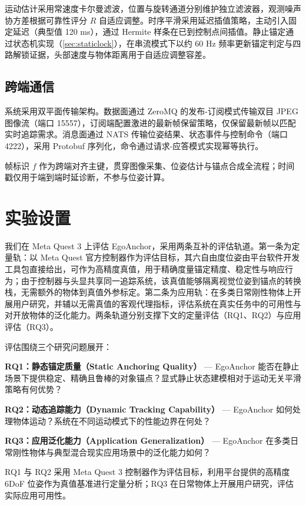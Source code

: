 \documentclass[review]{vgtc}
\begin{document}
运动估计采用常速度卡尔曼滤波，位置与旋转通道分别维护独立滤波器，观测噪声协方差根据可靠性评分 $R$ 自适应调整。时序平滑采用延迟插值策略，主动引入固定延迟（典型值 120 ms），通过 Hermite 样条在已到控制点间插值。静止锚定通过状态机实现（\ref{sec:staticlock}），在串流模式下以约 60 Hz 频率更新锚定判定与四路解锁证据，头部速度与物体距离用于自适应调整容差。

\subsection{跨端通信}


系统采用双平面传输架构。数据面通过 ZeroMQ 的发布-订阅模式传输双目 JPEG 图像流（端口 15557），订阅端配置激进的最新帧保留策略，仅保留最新帧以匹配实时追踪需求。消息面通过 NATS 传输位姿结果、状态事件与控制命令（端口 4222），采用 Protobuf 序列化，命令通过请求-应答模式实现幂等执行。

帧标识 $f$ 作为跨端对齐主键，贯穿图像采集、位姿估计与锚点合成全流程；时间戳仅用于端到端时延诊断，不参与位姿计算。

\section{实验设置}\label{sec:eval}


我们在 Meta Quest 3 上评估 EgoAnchor，采用两条互补的评估轨道。第一条为定量轨：以 Meta Quest 官方控制器作为评估目标，其六自由度位姿由平台软件开发工具包直接给出，可作为高精度真值，用于精确度量锚定精度、稳定性与响应行为；由于控制器与头显共享同一追踪系统，该真值能够隔离视觉位姿到锚点的转换栈，无需额外的物体到真值外参标定。第二条为应用轨：在多类日常刚性物体上开展用户研究，并辅以无需真值的客观代理指标，评估系统在真实任务中的可用性与对开放物体的泛化能力。两条轨道分别支撑下文的定量评估（RQ1、RQ2）与应用评估（RQ3）。

评估围绕三个研究问题展开：

\textbf{RQ1：静态锚定质量（Static Anchoring Quality）} --- EgoAnchor 能否在静止场景下提供稳定、精确且鲁棒的对象锚点？显式静止状态建模相对于运动无关平滑策略有何优势？

\textbf{RQ2：动态追踪能力（Dynamic Tracking Capability）} --- EgoAnchor 如何处理物体运动？系统在不同运动模式下的性能边界在何处？

\textbf{RQ3：应用泛化能力（Application Generalization）} --- EgoAnchor 在多类日常刚性物体与典型混合现实应用场景中的泛化能力如何？

RQ1 与 RQ2 采用 Meta Quest 3 控制器作为评估目标，利用平台提供的高精度 6DoF 位姿作为真值基准进行定量分析；RQ3 在日常物体上开展用户研究，评估实际应用可用性。
\end{document}
